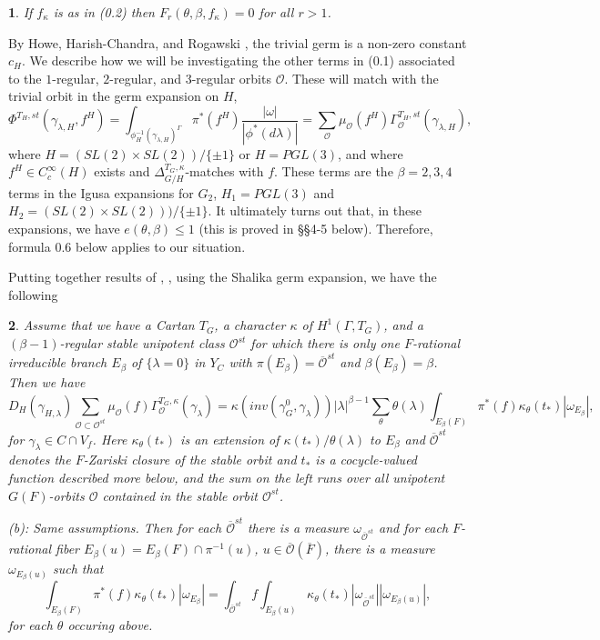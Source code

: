 \documentclass[12pt,letterpaper]{amsart}
\newcommand{\proclaimname}{}
\newtheorem*{proclaimx}{\proclaimname}
\newenvironment{proclaim}[1]%
  {\renewcommand{\proclaimname}{#1}\begin{proclaimx}}{\end{proclaimx}}
\begin{document}
\begin{proclaim}{Lemma 0.4} If $f_\kappa$ is as in (0.2) then
$F_r(\theta,\beta,f_\kappa)=0$
for all $r>1$.
\end{proclaim}

By Howe, Harish-Chandra, and
Rogawski \cite{Ro80}, the trivial germ is a non-zero constant $c_H$.
We describe how we will be investigating the other
terms in (0.1) associated to the
$1$-regular, $2$-regular,
and $3$-regular orbits ${\mathcal O}$.
These will match with the trivial orbit in the germ expansion on $H$,
\[
\Phi^{T_H,st}(\gamma_{\lambda,H},f^H)
=\int_{\phi_H^{-1}(\gamma_{\lambda,H})^\Gamma}\pi^*(f^H)
\frac{|\omega|}{|\phi^*(d\lambda)|}
=\sum_{{\mathcal O}}\mu_{\mathcal O}(f^H)
\Gamma_{{\mathcal O}}^{T_H,st}(\gamma_{\lambda,H}),
\tag{0.5}
\]
where $H=(SL(2)\times SL(2))/\{\pm 1\}$ or $H=PGL(3)$, and where
$f^H\in C_c^\infty(H)$ exists and
$\Delta^{T_G,\kappa}_{G/H}$-matches with $f$.
These terms are the $\beta =2,3,4$ terms in the Igusa expansions
for $G_2$, $H_1=PGL(3)$ and $H_2=(SL(2)\times SL(2)))/\{\pm 1\}$.
It ultimately turns out that, in these expansions, we have
$e(\theta,\beta)\leq 1$ (this is proved in \S\S 4-5 below).
Therefore, formula 0.6 below applies to our situation.

Putting together results of \cite{La83}, \cite[\S 2]{Ha89},
using the Shalika germ expansion, we
have the following

\begin{proclaim}{Formula 0.6(a)} Assume that we have a Cartan $T_G$, a character
$\kappa$ of $H^1(\Gamma,T_G)$, and
a $(\beta-1)$-regular
stable unipotent class ${\mathcal O}^{st}$ for which there is only
one $F$-rational irreducible branch $E_\beta$ of $\{\lambda =0\}$ in
$Y_C$ with $\pi(E_\beta)=\overline{{\mathcal O}}^{st}$ and
$\beta(E_\beta)=\beta$. Then we have
\[
D_H(\gamma_{H,\lambda})
\sum_{{\mathcal O}\subset {\mathcal O}^{st}}
\mu_{{\mathcal O}}(f)\Gamma_{{\mathcal O}}^{T_G,\kappa}(\gamma_\lambda)
=\kappa(inv(\gamma_G^0,\gamma_\lambda))
|\lambda|^{\beta -1}\sum_{\theta}\theta(\lambda)
\int_{E_\beta(F)} \pi^*(f)\kappa_\theta(t_*)|\omega_{E_\beta}|,
\]
for $\gamma_\lambda\in C\cap V_f$. Here $\kappa_\theta(t_*)$
is an extension of $\kappa(t_*)/\theta(\lambda)$ to
$E_\beta$ and $\overline{{\mathcal O}}^{st}$ denotes the $F$-Zariski closure
of the stable orbit and $t_*$ is a cocycle-valued function
described more below, and the sum on the left runs over all
unipotent $G(F)$-orbits ${\mathcal O}$ contained in the
stable orbit ${\mathcal O}^{st}$.

(b): Same assumptions. Then for each $\overline{\mathcal O}^{st}$
there is a measure $\omega_{\overline{\mathcal O}^{st}}$ and for each
$F$-rational fiber
$E_\beta(u)=E_\beta(F)\cap \pi^{-1}(u)$,
$u\in \overline{\mathcal O}(\overline{F})$,
there is a measure
$\omega_{E_\beta(u)}$ such that
\[
\int_{E_\beta(F)} \pi^*(f)\kappa_\theta(t_*)|\omega_{E_\beta}|
=\int_{\overline{\mathcal O}^{st}}f\int_{E_\beta(u)} \kappa_\theta(t_*)
|\omega_{\overline{\mathcal O}^{st}}||\omega_{E_\beta(u)}|,
\]
for each $\theta$ occuring above.
\end{proclaim}
\end{document}
